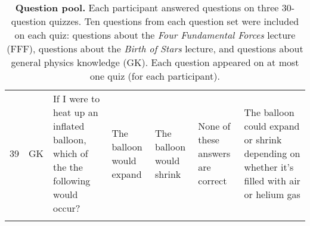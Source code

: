 \documentclass[10pt]{article}
\begin{document}
\begin{tiny}
\begin{longtable}{r|p{0.375in}|p{1.275in}|p{0.75in}|p{0.75in}|p{0.75in}|p{0.75in}}
    39    &      GK &                                                                                                                                                                                                If I were to heat up an inflated balloon, which of the the following would occur? &                                                                                                              The balloon would expand &                                                                              The balloon would shrink &                                                                                          None of these answers are correct &                                        The balloon could expand or shrink depending on whether it's filled with air or helium gas \\

    \caption{\textbf{Question pool.}  Each participant answered questions on three 30-question quizzes.  Ten questions from each question set were included on each quiz: questions about the \textit{Four Fundamental Forces} lecture (FFF), questions about the \textit{Birth of Stars} lecture, and questions about general physics knowledge (GK).  Each question appeared on at most one quiz (for each participant).}

    \label{tab:questions}
    \end{longtable}
\end{tiny}

\newpage
\renewcommand{\refname}{Supplementary references}


\end{document}
